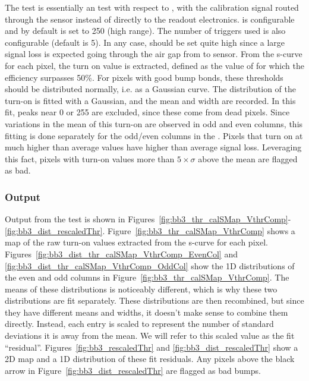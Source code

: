The \bb test is essentially an \scurves test with respect to \vthrcomp, 
with the calibration signal routed through the sensor instead of directly to the readout electronics.
\vcal is configurable and by default is set to 250 (high range).
The number of triggers used is also configurable (default is 5).
In any case, \vcal should be set quite high since a large signal loss is expected going through the air gap from \roc to sensor.
From the \vthrcomp s-curve for each pixel, the turn on value is extracted, 
defined as the value of \vthrcomp for which the efficiency surpasses 50\%.
For pixels with good bump bonds, these thresholds should be distributed normally, i.e. as a Gaussian curve.
The distribution of the \vthrcomp turn-on is fitted with a Gaussian, and the mean and width are recorded.
In this fit, peaks near 0 or 255 are excluded, since these come from dead pixels.
Since variations in the mean of this turn-on are observed in odd and even columns, 
this fitting is done separately for the odd/even columns in the \roc.
Pixels that turn on at much higher than average \vthrcomp values have higher than average signal loss.
Leveraging this fact, pixels with turn-on values more than $5\times\sigma$ above the mean are flagged as bad.

\subsubsection{Output}

Output from the \bb test is shown in Figures~\ref{fig:bb3_thr_calSMap_VthrComp}-\ref{fig:bb3_dist_rescaledThr}.
Figure~\ref{fig:bb3_thr_calSMap_VthrComp} shows a \roc map of the raw turn-on values extracted from the \vthrcomp s-curve for each pixel.
Figures~\ref{fig:bb3_dist_thr_calSMap_VthrComp_EvenCol} and \ref{fig:bb3_dist_thr_calSMap_VthrComp_OddCol} 
show the 1D distributions of the even and odd columns in Figure~\ref{fig:bb3_thr_calSMap_VthrComp}.
The means of these distributions is noticeably different, which is why these two distributions are fit separately.
These distributions are then recombined, but since they have different means and widths,
it doesn't make sense to combine them directly.
Instead, each entry is scaled to represent the number of standard deviations it is away from the mean.
We will refer to this scaled value as the fit ``residual''.
Figures~\ref{fig:bb3_rescaledThr} and \ref{fig:bb3_dist_rescaledThr} show a 2D \roc map and a 1D distribution of these fit residuals.
Any pixels above the black arrow in Figure~\ref{fig:bb3_dist_rescaledThr} are flagged as bad bumps.

